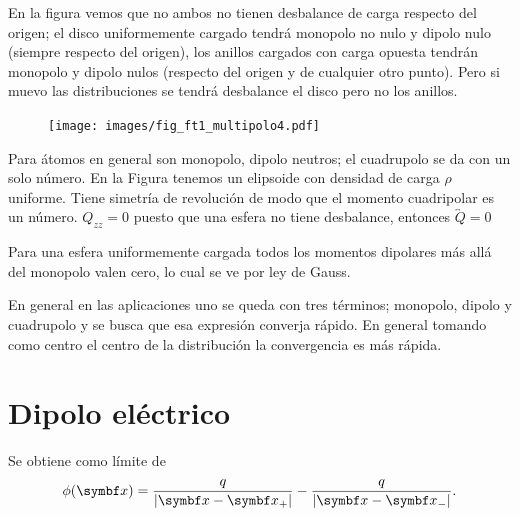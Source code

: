 \documentclass[10pt,oneside]{CBFT_book}
\begin{document}
En la figura vemos que no ambos no tienen desbalance de carga respecto del origen; el disco uniformemente
cargado tendrá monopolo no nulo y dipolo nulo (siempre respecto del origen), los anillos cargados con carga
opuesta tendrán monopolo y dipolo nulos (respecto del origen y de cualquier otro punto). Pero si muevo las
distribuciones se tendrá desbalance el disco pero no los anillos.

\begin{figure}[htb]
	\begin{center}
	\texttt{[image: images/fig\_ft1\_multipolo4.pdf]}	 
	\end{center}
	\caption{}
\end{figure}

Para átomos en general son monopolo, dipolo neutros; el cuadrupolo se da con un solo número. 
En la Figura tenemos un elipsoide con densidad de carga $\rho$ uniforme. Tiene simetría de revolución
de modo que el momento cuadripolar es un número. $Q_{zz} = 0 $ puesto que una esfera no tiene
desbalance, entonces $\overleftrightarrow{Q} = 0 $ 

Para una esfera uniformemente cargada todos los momentos dipolares más allá del monopolo valen
cero, lo cual se ve por ley de Gauss.

En general en las aplicaciones uno se queda con tres términos; monopolo, dipolo y cuadrupolo y se
busca que esa expresión converja rápido. En general tomando como centro el centro de la distribución
la convergencia es más rápida.


\section{Dipolo eléctrico}

Se obtiene como límite de 
\[
	\phi(\vb{x}) = \frac{ q }{| \vbx - \vbx_+ |}  - \frac{ q }{| \vbx - \vbx_- |}.
\]
\end{document}
